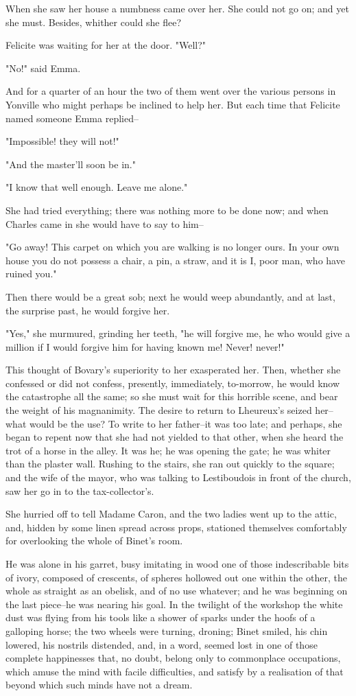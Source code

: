 \documentclass[11pt,twocolumn]{ltugboat}
\begin{document}
When she saw her house a numbness came over her. She could not go on;
and yet she must. Besides, whither could she flee?

Felicite was waiting for her at the door. "Well?"

"No!" said Emma.

And for a quarter of an hour the two of them went over the various
persons in Yonville who might perhaps be inclined to help her. But each
time that Felicite named someone Emma replied--

"Impossible! they will not!"

"And the master'll soon be in."

"I know that well enough. Leave me alone."

She had tried everything; there was nothing more to be done now; and
when Charles came in she would have to say to him--

"Go away! This carpet on which you are walking is no longer ours. In
your own house you do not possess a chair, a pin, a straw, and it is I,
poor man, who have ruined you."

Then there would be a great sob; next he would weep abundantly, and at
last, the surprise past, he would forgive her.

"Yes," she murmured, grinding her teeth, "he will forgive me, he who
would give a million if I would forgive him for having known me! Never!
never!"

This thought of Bovary's superiority to her exasperated her. Then,
whether she confessed or did not confess, presently, immediately,
to-morrow, he would know the catastrophe all the same; so she must wait
for this horrible scene, and bear the weight of his magnanimity. The
desire to return to Lheureux's seized her--what would be the use? To
write to her father--it was too late; and perhaps, she began to repent
now that she had not yielded to that other, when she heard the trot of
a horse in the alley. It was he; he was opening the gate; he was whiter
than the plaster wall. Rushing to the stairs, she ran out quickly to the
square; and the wife of the mayor, who was talking to Lestiboudois in
front of the church, saw her go in to the tax-collector's.

She hurried off to tell Madame Caron, and the two ladies went up to
the attic, and, hidden by some linen spread across props, stationed
themselves comfortably for overlooking the whole of Binet's room.

He was alone in his garret, busy imitating in wood one of those
indescribable bits of ivory, composed of crescents, of spheres hollowed
out one within the other, the whole as straight as an obelisk, and of no
use whatever; and he was beginning on the last piece--he was nearing his
goal. In the twilight of the workshop the white dust was flying from his
tools like a shower of sparks under the hoofs of a galloping horse; the
two wheels were turning, droning; Binet smiled, his chin lowered, his
nostrils distended, and, in a word, seemed lost in one of those complete
happinesses that, no doubt, belong only to commonplace occupations,
which amuse the mind with facile difficulties, and satisfy by a
realisation of that beyond which such minds have not a dream.
\end{document}
